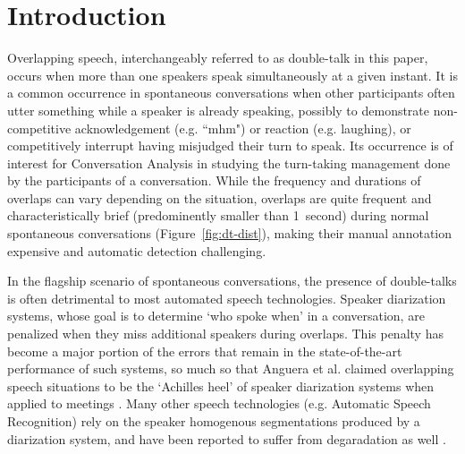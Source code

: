 \documentclass[a4paper]{article}
\begin{document}
\section{Introduction}

Overlapping speech, interchangeably referred to as double-talk in this paper,
occurs when more than one speakers speak simultaneously at a given instant.
It is a common occurrence in spontaneous conversations when
other participants often utter something while a speaker is already speaking,
possibly to demonstrate non-competitive acknowledgement (e.g. “mhm") or reaction (e.g. laughing),
or competitively interrupt having misjudged their turn to speak.
Its occurrence is of interest for Conversation Analysis in studying the
turn-taking management done by the participants of a conversation.
While the frequency and durations of overlaps can vary depending on the situation,
overlaps are quite frequent and characteristically brief (predominently smaller than 1~second)
during normal spontaneous conversations (Figure~\ref{fig:dt-dist}),
making their manual annotation expensive and automatic detection challenging.

In the flagship scenario of spontaneous conversations,
the presence of double-talks is often detrimental to most automated speech technologies.
Speaker diarization systems, whose goal is to determine `who spoke when' in a conversation,
are penalized when they miss additional speakers during overlaps.
This penalty has become a major portion of the errors that remain in the
state-of-the-art performance of such systems,
so much so that Anguera et al. claimed overlapping speech situations to be the `Achilles heel' of
speaker diarization systems when applied to meetings \cite{anguera_speaker_2012}.
Many other speech technologies (e.g. Automatic Speech Recognition)
rely on the speaker homogenous segmentations produced by a diarization system,
and have been reported to suffer from degaradation as well \cite{cetin_speaker_2006,RenalsDistantspeechrecognition2017}.
\end{document}
